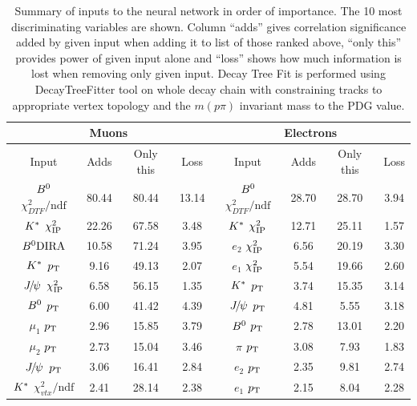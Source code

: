 \begin{table}
\centering
\caption{Summary of inputs to the neural network in order of importance. The 10 most discriminating variables are shown.
Column ``adds'' gives correlation significance added by given input when adding it to list of those
ranked above, ``only this'' provides power of given input alone and ``loss'' shows how much information
is lost when removing only given input. Decay Tree Fit is performed using DecayTreeFitter tool
on whole decay chain with constraining tracks to appropriate vertex topology and the $m(p\pi)$
invariant mass to the PDG value.}
\begin{tabular}{|c|ccc|c|ccc|}\hline
\multicolumn{4}{|c|}{Muons} 														& \multicolumn{4}{c|}{Electrons}						  \\ \hline   
Input                   			& Adds 			& Only this 	& Loss 			& Input        							& Adds      & Only this & Loss    \\ \hline
$ {{B}^0}$ $\chi^2_{DTF}/\text{ndf} $		& 80.44 		& 80.44 		& 13.14  		&	$ {{B}^0}$ $\chi^2_{DTF}/\text{ndf} $		& 28.70 		& 28.70 		& 3.94  \\
$ {{K}^*}$ $\chi^2_{\rm IP} $		& 22.26 		& 67.58 		& 3.48  		&	$ {{K}^*}$ $\chi^2_{\rm IP} $		& 12.71 		& 25.11 		& 1.57  \\
$ {{B}^0}\text{DIRA} $		& 10.58 		& 71.24 		& 3.95  		&	$ e_{2}$ $\chi^2_{\rm IP} $		& 6.56 		& 20.19 		& 3.30  \\
$ {{K}^*}$ $\mbox{$p_{\rm T}$} $		& 9.16 		& 49.13 		& 2.07  		&	$ e_{1}$ $\chi^2_{\rm IP} $		& 5.54 		& 19.66 		& 2.60  \\
$ \jpsi$ $\chi^2_{\rm IP} $		& 6.58 		& 56.15 		& 1.35  		&	$ {{K}^*}$ $\mbox{$p_{\rm T}$} $		& 3.74 		& 15.35 		& 3.14  \\
$ {{B}^0}$ $\mbox{$p_{\rm T}$} $		& 6.00 		& 41.42 		& 4.39  		&	$ \jpsi$ $\mbox{$p_{\rm T}$} $		& 4.81 		& 5.55 		& 3.18  \\
$ \mu_{1}$ $\mbox{$p_{\rm T}$} $		& 2.96 		& 15.85 		& 3.79  		&	$ {{B}^0}$ $\mbox{$p_{\rm T}$} $		& 2.78 		& 13.01 		& 2.20  \\
$ \mu_{2}$ $\mbox{$p_{\rm T}$} $		& 2.73 		& 15.04 		& 3.46  		&	$ \pi$ $\mbox{$p_{\rm T}$} $		& 3.08 		& 7.93 		& 1.83  \\
$ \jpsi$ $\mbox{$p_{\rm T}$} $		& 3.06 		& 16.41 		& 2.84  		&	$ e_{2}$ $\mbox{$p_{\rm T}$} $		& 2.35 		& 9.81 		& 2.74  \\
$ {{K}^*}$ $\chi^2_{vtx}/\text{ndf} $		& 2.41 		& 28.14 		& 2.38  		&	$ e_{1}$ $\mbox{$p_{\rm T}$} $		& 2.15 		& 8.04 		& 2.28  \\


\end{tabular}
\end{table}
